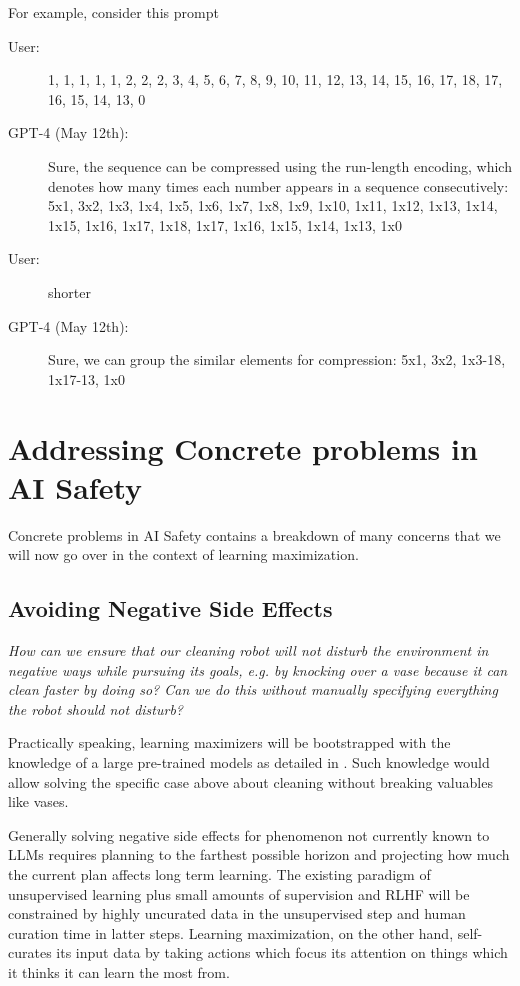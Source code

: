 \documentclass{article}
\begin{document}
For example, consider this prompt


\begin{description}
    \item[User:] 1, 1, 1, 1, 1, 2, 2, 2, 3, 4, 5, 6, 7, 8, 9, 10, 11, 12, 13, 14, 15, 16, 17, 18, 17, 16, 15, 14, 13, 0
    \item[GPT-4 (May 12th):] Sure, the sequence can be compressed using the run-length encoding, which denotes how many times each number appears in a sequence consecutively:
    5x1, 3x2, 1x3, 1x4, 1x5, 1x6, 1x7, 1x8, 1x9, 1x10, 1x11, 1x12, 1x13, 1x14, 1x15, 1x16, 1x17, 1x18, 1x17, 1x16, 1x15, 1x14, 1x13, 1x0
    \item[User:] shorter
    \item[GPT-4 (May 12th):] Sure, we can group the similar elements for compression: 5x1, 3x2, 1x3-18, 1x17-13, 1x0
\end{description}

\newpage

\section{Addressing Concrete problems in AI Safety}

Concrete problems in AI Safety \cite{amodei2016concrete} contains a breakdown of many concerns that we will now go over in the context of learning maximization.

\subsection{Avoiding Negative Side Effects}
\textit{How can we ensure that our cleaning robot will not
disturb the environment in negative ways while pursuing its goals, e.g. by knocking over a vase because it can clean faster by doing so? Can we do this without manually specifying everything the robot should not disturb?}

\hspace{1pt}

Practically speaking, learning maximizers will be bootstrapped with the knowledge of a large pre-trained models \cite{openai2023gpt4} as detailed in . Such knowledge would allow solving the specific case above about cleaning without breaking valuables like vases.

Generally solving negative side effects for phenomenon not currently known to LLMs requires planning to the farthest possible horizon and projecting how much the current plan affects long term learning. The existing paradigm of unsupervised learning plus small amounts of supervision and RLHF \cite{karpathy-2023-msbuild} will be constrained by highly uncurated data in the unsupervised step and human curation time in latter steps. Learning maximization, on the other hand, self-curates its input data by taking actions which focus its attention on things which it thinks it can learn the most from.
\end{document}
